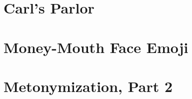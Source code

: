 
\setcounter{chapter}{7}
\chapter{Carl's Parlor}

\setcounter{chapter}{8}
\chapter{Money-Mouth Face Emoji}

\setcounter{chapter}{9}
\chapter{Metonymization, Part 2}